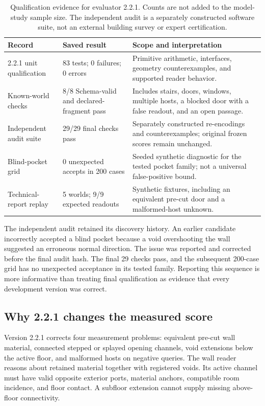 \begin{table}[htbp]
\centering\small
\begin{tabular}{@{}p{.24\linewidth}p{.18\linewidth}p{.49\linewidth}@{}}
\toprule
Record & Saved result & Scope and interpretation\\
\midrule
2.2.1 unit qualification & 83 tests; 0 failures; 0 errors & Primitive arithmetic, interfaces, geometry counterexamples, and supported reader behavior.\\
Known-world checks & 8/8 Schema-valid and declared-fragment pass & Includes stairs, doors, windows, multiple hosts, a blocked door with a false readout, and an open passage.\\
Independent audit suite & 29/29 final checks pass & Separately constructed re-encodings and counterexamples; original frozen scores remain unchanged.\\
Blind-pocket grid & 0 unexpected accepts in 200 cases & Seeded synthetic diagnostic for the tested pocket family; not a universal false-positive bound.\\
Technical-report replay & 5 worlds; 9/9 expected readouts & Synthetic fixtures, including an equivalent pre-cut door and a malformed-host unknown.\\
\bottomrule
\end{tabular}
\caption{Qualification evidence for evaluator 2.2.1. Counts are not added to the model-study sample size. The independent audit is a separately constructed software suite, not an external building survey or expert certification.}
\label{tab:evaluator-qualification}
\end{table}

The independent audit retained its discovery history. An earlier candidate incorrectly accepted a blind pocket because a void overshooting the wall suggested an erroneous normal direction. The issue was reported and corrected before the final audit hash. The final 29 checks pass, and the subsequent 200-case grid has no unexpected acceptance in its tested family. Reporting this sequence is more informative than treating final qualification as evidence that every development version was correct.

\subsection{Why 2.2.1 changes the measured score}
Version 2.2.1 corrects four measurement problems: equivalent pre-cut wall material, connected stepped or splayed opening channels, void extensions below the active floor, and malformed hosts on negative queries. The wall reader reasons about retained material together with registered voids. Its active channel must have valid opposite exterior ports, material anchors, compatible room incidence, and floor contact. A subfloor extension cannot supply missing above-floor connectivity.

